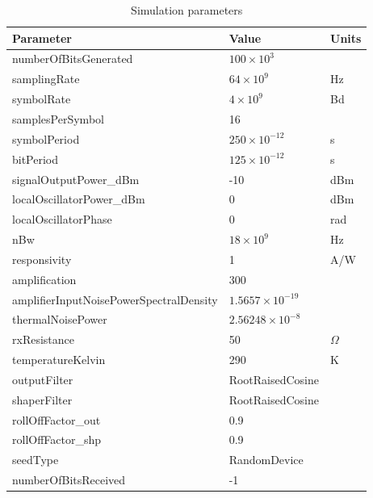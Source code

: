 	\begin{longtable}[h]{|l|l|l|}
	\caption{Simulation parameters\label{tab:simParams_eNoise_varAmp}}\\\hline
	\textbf{Parameter}            & \textbf{Value}       &\textbf{Units}\\\hline
	numberOfBitsGenerated         & $100 \times 10^3$    & \\\hline
	samplingRate                  & $64 \times 10^9$     & Hz \\\hline
	symbolRate                    & $4 \times 10^9$      & Bd \\\hline
	samplesPerSymbol              & 16                   & \\\hline
	symbolPeriod                  & $250\times 10^{-12}$ & s\\\hline
	bitPeriod                     & $125\times 10^{-12}$ & s\\\hline
	signalOutputPower\_dBm        & -10                  & dBm\\\hline
	localOscillatorPower\_dBm     & 0                    & dBm\\\hline
	localOscillatorPhase          & 0                    & rad\\\hline
	nBw                           & $18\times10^9$       & Hz\\\hline
	responsivity                  & 1                    & A/W\\\hline
	amplification                 & 300    
	              & \\\hline
	amplifierInputNoisePowerSpectralDensity & $1.5657 \times 10^{-19}$ & \\\hline
	thermalNoisePower             & $2.56248 \times 10^{-8}$          & \\\hline
	rxResistance                  & 50 & $\Omega$\\\hline
	temperatureKelvin             & 290 & K\\\hline
	outputFilter                  & RootRaisedCosine     & \\\hline
	shaperFilter                  & RootRaisedCosine     & \\\hline
	rollOffFactor\_out            & 0.9                  & \\\hline
	rollOffFactor\_shp            & 0.9                  & \\\hline
	seedType                      & RandomDevice         & \\\hline
	numberOfBitsReceived          & -1                   & \\\hline

\end{longtable}
